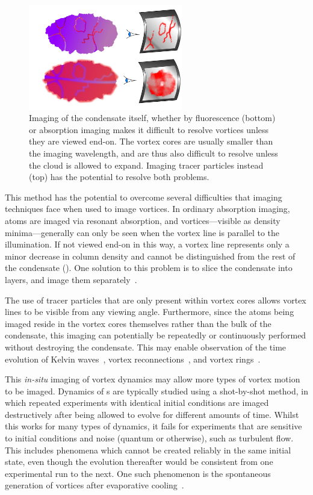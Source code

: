 \begin{figure}
\begin{center}
\includegraphics[width=0.6\textwidth]{figures/unsorted/side-on.pdf}
\caption{Imaging of the condensate itself, whether by fluorescence (bottom) or absorption imaging makes it difficult to resolve vortices unless they are viewed end-on. The vortex cores are usually smaller than the imaging wavelength, and are thus also difficult to resolve unless the cloud is allowed to expand. Imaging tracer particles instead (top) has the potential to resolve both problems.}\label{fig:side_on}
\end{center}
\end{figure}

This method has the potential to overcome several difficulties that imaging techniques face when used to image vortices. In ordinary absorption imaging, atoms are imaged via resonant absorption, and vortices---visible as density minima---generally can only be seen when the vortex line is parallel to the illumination. If not viewed end-on in this way, a vortex line represents only a minor decrease in column density and cannot be distinguished from the rest of the condensate (). One solution to this problem is to slice the condensate into layers, and image them separately~\cite{anderson_watching_2001}.

The use of tracer particles that are only present within vortex cores allows vortex lines to be visible from any viewing angle.  Furthermore, since the atoms being imaged reside in the vortex cores themselves rather than the bulk of the condensate, this imaging can potentially be repeatedly or continuously performed without destroying the condensate. This may enable observation of the time evolution of Kelvin waves~\cite{bretin_quadrupole_2003}, vortex reconnections~\cite{leadbeater_sound_2001}, and vortex rings~\cite{anderson_watching_2001}.

This \emph{in-situ} imaging of vortex dynamics may allow more types of vortex motion to be imaged. Dynamics of \bec s are typically studied using a shot-by-shot method, in which repeated experiments with identical initial conditions are imaged destructively after being allowed to evolve for different amounts of time. Whilst this works for many types of dynamics, it fails for experiments that are sensitive to initial conditions and noise (quantum or otherwise), such as turbulent flow. This includes phenomena which cannot be created reliably in the same initial state, even though the evolution thereafter would be consistent from one experimental run to the next. One such phenomenon is the spontaneous generation of vortices after evaporative cooling~\cite{weiler_spontaneous_2008}.

